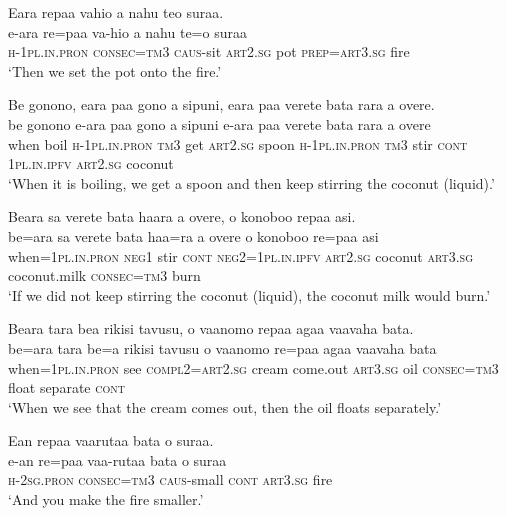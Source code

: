 \ea\label{ex:text01-129}
Eara repaa vahio a nahu teo suraa.\\
\gll e-ara	re=paa	va-hio	a	nahu	te=o	suraa\\
     \textsc{h}-1\textsc{pl}.\textsc{in}.\textsc{pron}	\textsc{consec}=\textsc{tm}3	\textsc{caus}-sit	\textsc{art}2.\textsc{sg}	pot	\textsc{prep}=\textsc{art}3.\textsc{sg}	fire\\
\glt `Then we set the pot onto the fire.'
\z

\newpage
\ea\label{ex:text01-130}
Be gonono, eara paa gono a sipuni, eara paa verete bata rara a overe.\\
\gll be	gonono	e-ara	paa	gono	a	sipuni	e-ara	paa	verete	bata	rara	a	overe\\
     when	boil	\textsc{h}-1\textsc{pl}.\textsc{in}.\textsc{pron}	\textsc{tm}3	get	\textsc{art}2.\textsc{sg}	spoon	\textsc{h}-1\textsc{pl}.\textsc{in}.\textsc{pron}	\textsc{tm}3	stir	\textsc{cont}	1\textsc{pl}.\textsc{in}.\textsc{ipfv}	\textsc{art}2.\textsc{sg}	coconut\\
\glt `When it is boiling, we get a spoon and then keep stirring the coconut (liquid).'
\z

\ea\label{ex:text01-131}
Beara sa verete bata haara a overe, o konoboo repaa asi.\\
\gll be=ara	sa	verete	bata	haa=ra	a	overe	o	konoboo	re=paa	asi\\
     when=1\textsc{pl}.\textsc{in}.\textsc{pron}	\textsc{neg}1	stir	\textsc{cont}	\textsc{neg}2=1\textsc{pl}.\textsc{in}.\textsc{ipfv}	\textsc{art}2.\textsc{sg}	coconut	\textsc{art}3.\textsc{sg}	coconut.milk	\textsc{consec}=\textsc{tm}3	burn\\
\glt `If we did not keep stirring the coconut (liquid), the coconut milk would burn.'
\z

\ea\label{ex:text01-132}
Beara tara bea rikisi tavusu, o vaanomo repaa agaa vaavaha bata.\\
\gll be=ara	tara	be=a	rikisi	tavusu	o	vaanomo	re=paa	agaa	vaavaha	bata\\
     when=1\textsc{pl}.\textsc{in}.\textsc{pron}	see	\textsc{compl}2=\textsc{art}2.\textsc{sg}	cream	come.out	\textsc{art}3.\textsc{sg}	oil	\textsc{consec}=\textsc{tm}3	float	separate	\textsc{cont}\\
\glt `When we see that the cream comes out, then the oil floats separately.'
\z

\ea\label{ex:text01-133}
Ean repaa vaarutaa bata o suraa.\\
\gll e-an	re=paa	vaa-rutaa	bata	o	suraa\\
     \textsc{h}-2\textsc{sg}.\textsc{pron}	\textsc{consec}=\textsc{tm}3	\textsc{caus}-small	\textsc{cont}	\textsc{art}3.\textsc{sg}	fire\\
\glt `And you make the fire smaller.'
\z

